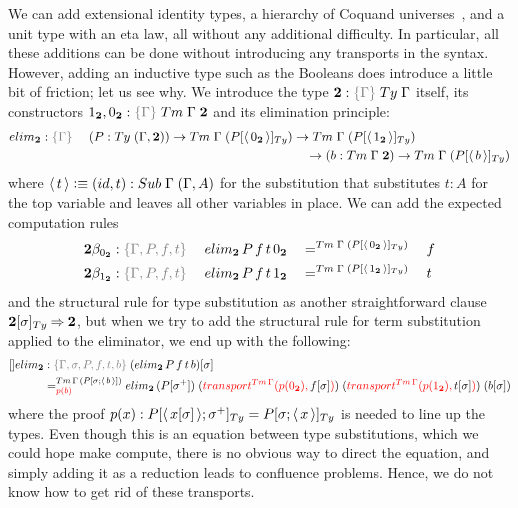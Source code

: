 \documentclass[a4paper,UKenglish,numberwithinsect,cleveref,thm-restate]{lipics-v2021}
\begin{document}
We can add extensional identity types, a hierarchy of Coquand universes~\cite{Coquand2018}, and a unit type with an eta law, all without any additional difficulty. In particular, all these additions can be done without introducing any transports in the syntax. However, adding an inductive type such as the Booleans does introduce a little bit of friction; let us see why.
We introduce the type $\bool : \implicit{\Gamma}\;\Ty\;\Gamma$ itself, its constructors $\btrue, \bfalse : \implicit{\Gamma}\;\Tm\;\Gamma\;\bool$ and its elimination principle:
%
\begin{alignat*}{3}
  \belim &: \implicit{\Gamma} \; && (P : \Ty\;(\Gamma , \bool)) \to \Tm\;\Gamma\;(\subTy{P}{\instSub{\bfalse}}) \to \Tm\;\Gamma\;(\subTy{P}{\instSub{\btrue}}) \\
  &&& \qquad\qquad\qquad\qquad\qquad\qquad\qquad\qquad\quad \to (b : \Tm\;\Gamma\;\bool) \to \Tm\;\Gamma\;(\subTy{P}{\instSub{b}})
\end{alignat*}
%
where $\instSub{t} \defeq (\idS, t) : \Sub\;\Gamma\;(\Gamma, A)$ for the substitution that substitutes $t : A$ for the top variable and leaves all other variables in place. We can add the expected computation rules
%
\begin{alignat*}{5}
  \bool\beta_{\bfalse}           & : \implicit{\Gamma, P, f, t}\; && \belim\,P\,f\,t\,\bfalse && =^{\Tm\;\Gamma\;(\subTy{P}{\instSub{\bfalse}})} {} && f \\
  \bool\beta_{\btrue}           & : \implicit{\Gamma, P, f, t}\; && \belim\,P\,f\,t\,\btrue && =^{\Tm\;\Gamma\;(\subTy{P}{\instSub{\btrue}})} {} && t
\end{alignat*}
%
and the structural rule for type substitution as another straightforward clause
$\subTy{\bool}{\sigma} \reduce \bool$,
but when we try to add the structural rule for term substitution applied to the eliminator, we end up with the following:
%
\begin{alignat*}{5}
  []\belim & : \implicit{\Gamma, \sigma, P, f, t, b}\; \sub{(\belim\,P\,f\,t\,b)}{\sigma} \\
           & =^{\Tm\,\Gamma\,(\sub{P}{\sigma; \instSub{b}})}_{\alert{p(b)}} \belim\,(\sub{P}{\sigma^+})\;(\alert{\transfib{\Tm\,\Gamma}{p(\bfalse)}{\textcolor{black}{\sub{f}{\sigma}}}})\;(\alert{\transfib{\Tm\,\Gamma}{p(\btrue)}{\textcolor{black}{\sub{t}{\sigma}}}})\; (\sub{b}{\sigma})
\end{alignat*}
where the proof $p(x) : \subTy{P}{\instSub{\sub{x}{\sigma}} ; \sigma^+} = \subTy{P}{\sigma ; \instSub{x}}$ is needed to line up the types. Even though this is an equation between type substitutions, which we could hope make compute, there is no obvious way to direct the equation, and simply adding it as a reduction leads to confluence problems. Hence, we do not know how to get rid of these transports.
\end{document}
